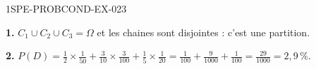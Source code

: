 \begin{corrige}{1SPE-PROBCOND-EX-023}

\textbf{1.} $C_1 \cup C_2 \cup C_3 = \Omega$ et les chaines sont disjointes : c'est une partition.

\textbf{2.} $P(D) = \frac{1}{2}\times\frac{1}{50} + \frac{3}{10}\times\frac{3}{100} + \frac{1}{5}\times\frac{1}{20} = \frac{1}{100}+\frac{9}{1000}+\frac{1}{100} = \frac{29}{1000} = 2{,}9\,\%$.

\end{corrige}
